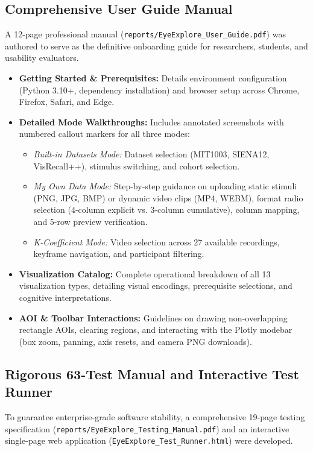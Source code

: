 \documentclass[11pt,a4paper]{article}
\begin{document}
\subsection{Comprehensive User Guide Manual}
A 12-page professional manual (\texttt{reports/EyeExplore\_User\_Guide.pdf}) was authored to serve as the definitive onboarding guide for researchers, students, and usability evaluators.
\begin{itemize}[noitemsep,topsep=2pt]
    \item \textbf{Getting Started \& Prerequisites:} Details environment configuration (Python 3.10+, dependency installation) and browser setup across Chrome, Firefox, Safari, and Edge.
    \item \textbf{Detailed Mode Walkthroughs:} Includes annotated screenshots with numbered callout markers for all three modes:
    \begin{itemize}
        \item \textit{Built-in Datasets Mode:} Dataset selection (MIT1003, SIENA12, VisRecall++), stimulus switching, and cohort selection.
        \item \textit{My Own Data Mode:} Step-by-step guidance on uploading static stimuli (PNG, JPG, BMP) or dynamic video clips (MP4, WEBM), format radio selection (4-column explicit vs. 3-column cumulative), column mapping, and 5-row preview verification.
        \item \textit{K-Coefficient Mode:} Video selection across 27 available recordings, keyframe navigation, and participant filtering.
    \end{itemize}
    \item \textbf{Visualization Catalog:} Complete operational breakdown of all 13 visualization types, detailing visual encodings, prerequisite selections, and cognitive interpretations.
    \item \textbf{AOI \& Toolbar Interactions:} Guidelines on drawing non-overlapping rectangle AOIs, clearing regions, and interacting with the Plotly modebar (box zoom, panning, axis resets, and camera PNG downloads).
\end{itemize}

\subsection{Rigorous 63-Test Manual and Interactive Test Runner}
To guarantee enterprise-grade software stability, a comprehensive 19-page testing specification (\texttt{reports/EyeExplore\_Testing\_Manual.pdf}) and an interactive single-page web application (\texttt{EyeExplore\_Test\_Runner.html}) were developed.
\end{document}
